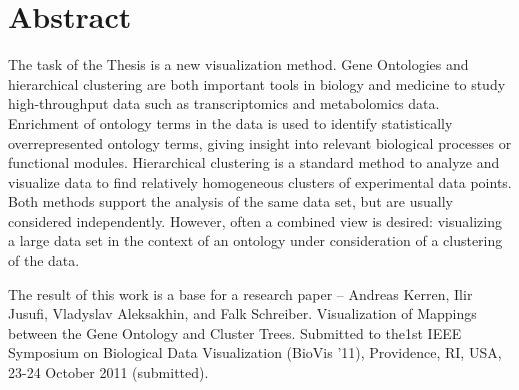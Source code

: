 \section*{Abstract}

The task of the Thesis is a new visualization method. Gene Ontologies and hierarchical clustering are both important tools in biology and medicine to study high-throughput data such as transcriptomics and metabolomics data. Enrichment of ontology terms in the data is used to identify statistically overrepresented ontology terms, giving insight into relevant biological processes or functional modules. Hierarchical clustering is a standard method to analyze and visualize data to find relatively homogeneous clusters of experimental data points. Both methods support the analysis of the same data set, but are usually considered independently. However, often a combined view is desired: visualizing a large data set in the context of an ontology under consideration of a clustering of the data.

The result of this work is a base for a research paper -- \textsf{Andreas Kerren, Ilir Jusufi, Vladyslav Aleksakhin, and Falk Schreiber. Visualization of Mappings between the Gene Ontology and Cluster Trees. Submitted to the1st IEEE Symposium on Biological Data Visualization (BioVis '11), Providence, RI, USA, 23-24 October 2011 (submitted).}